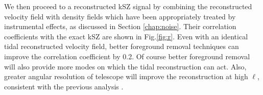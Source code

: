 We then proceed to a reconstructed kSZ signal by combining the reconstructed velocity field with density fields which have been appropriately treated by instrumental effects, as discussed in Section \ref{chap:noise}. Their correlation coefficients with the exact kSZ are shown in Fig.\ref{fig:r}. Even with an identical tidal reconstructed velocity field, better foreground removal techniques can improve the correlation coefficient by 0.2. Of course better foreground removal will also provide more modes on which the tidal reconstruction can act. Also, greater angular resolution of telescope will improve the reconstruction at high $\ell$, consistent with the previous analysis . 
